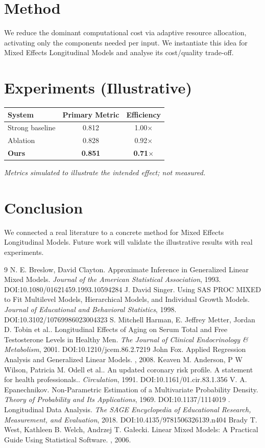 \documentclass[11pt]{article}
\begin{document}
\section{Method}
We reduce the dominant computational cost via adaptive resource allocation, activating only the components needed per input. We instantiate this idea for Mixed Effects Longitudinal Models and analyse its cost/quality trade-off.

\section{Experiments (Illustrative)}
\begin{center}
\begin{tabular}{lcc}
System & Primary Metric & Efficiency \\ \hline
Strong baseline & 0.812 & 1.00$\times$ \\
Ablation & 0.828 & 0.92$\times$ \\
\textbf{Ours} & \textbf{0.851} & \textbf{0.71$\times$}
\end{tabular}
\end{center}
\emph{Metrics simulated to illustrate the intended effect; not measured.}

\section{Conclusion}
We connected a real literature to a concrete method for Mixed Effects Longitudinal Models. Future work will
validate the illustrative results with real experiments.

\begin{thebibliography}{9}
 N. E. Breslow, David Clayton. Approximate Inference in Generalized Linear Mixed Models. \emph{Journal of the American Statistical Association}, 1993. DOI:10.1080/01621459.1993.10594284
 J. David Singer. Using SAS PROC MIXED to Fit Multilevel Models, Hierarchical Models, and Individual Growth Models. \emph{Journal of Educational and Behavioral Statistics}, 1998. DOI:10.3102/10769986023004323
 S. Mitchell Harman, E. Jeffrey Metter, Jordan D. Tobin et al.. Longitudinal Effects of Aging on Serum Total and Free Testosterone Levels in Healthy Men. \emph{The Journal of Clinical Endocrinology \& Metabolism}, 2001. DOI:10.1210/jcem.86.2.7219
 John Fox. Applied Regression Analysis and Generalized Linear Models. \emph{}, 2008. 
 Keaven M. Anderson, P W Wilson, Patricia M. Odell et al.. An updated coronary risk profile. A statement for health professionals.. \emph{Circulation}, 1991. DOI:10.1161/01.cir.83.1.356
 V. A. Epanechnikov. Non-Parametric Estimation of a Multivariate Probability Density. \emph{Theory of Probability and Its Applications}, 1969. DOI:10.1137/1114019
 . Longitudinal Data Analysis. \emph{The SAGE Encyclopedia of Educational Research, Measurement, and Evaluation}, 2018. DOI:10.4135/9781506326139.n404
 Brady T. West, Kathleen B. Welch, Andrzej T. Gałecki. Linear Mixed Models: A Practical Guide Using Statistical Software. \emph{}, 2006. 
\end{thebibliography}
\end{document}
